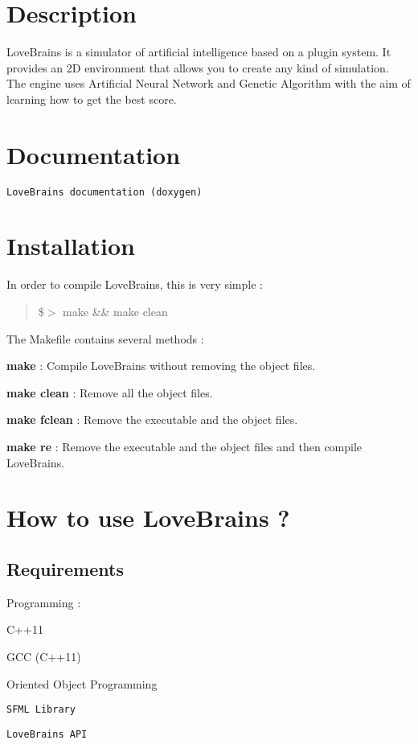\section*{Description}

Love\+Brains is a simulator of artificial intelligence based on a plugin system. It provides an 2\+D environment that allows you to create any kind of simulation. The engine uses Artificial Neural Network and Genetic Algorithm with the aim of learning how to get the best score.

\section*{Documentation}

{\tt Love\+Brains documentation (doxygen)}

\section*{Installation}

In order to compile Love\+Brains, this is very simple \+: \begin{quote}
\$$>$ make \&\& make clean \end{quote}


The Makefile contains several methods \+:


\begin{DoxyItemize}
\item {\bfseries make} \+: Compile Love\+Brains without removing the object files.
\item {\bfseries make clean} \+: Remove all the object files.
\item {\bfseries make fclean} \+: Remove the executable and the object files.
\item {\bfseries make re} \+: Remove the executable and the object files and then compile Love\+Brains.
\end{DoxyItemize}

\section*{How to use Love\+Brains ?}

\subsection*{Requirements}

Programming \+:


\begin{DoxyItemize}
\item C++11
\item G\+C\+C (C++11)
\item Oriented Object Programming
\item {\tt S\+F\+M\+L Library}
\item {\tt Love\+Brains A\+P\+I}
\end{DoxyItemize}

